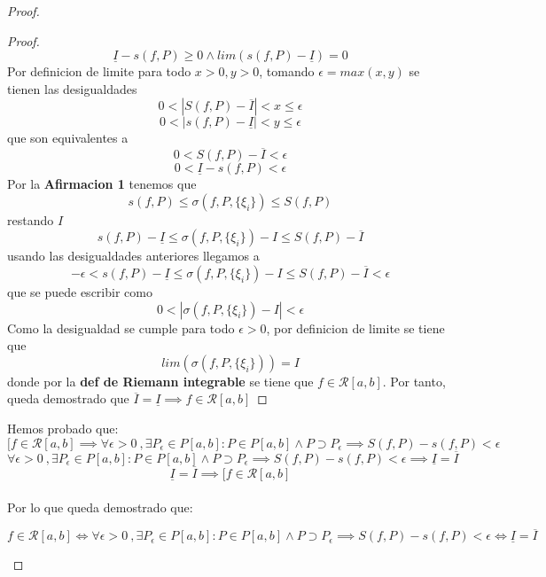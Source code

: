 \documentclass{article}
\begin{document}
\begin{proof}
\begin{enumerate}
\begin{proof}
\[
\underline{I} - s(f, P) \geq 0 \wedge lim (s(f, P) - \underline{I}) = 0
\]
Por definicion de limite para todo \(x > 0, y > 0\), tomando \(\epsilon = max(x, y)\) se tienen las desigualdades 
\[
0< |S(f, P) - \overline{I} | < x \leq \epsilon
\]
\[
0< |s(f, P) - \underline{I} | < y \leq \epsilon 
\]
que son equivalentes a
\[
0< S(f, P) - \overline{I}  < \epsilon
\]
\[
0<  \underline{I} -  s(f, P)  < \epsilon
\]
Por la \textbf{Afirmacion 1} tenemos que 
\[
s(f, P) \leq \sigma(f, P,\{\xi_i\}) \leq S(f, P)
\]
restando \(I\)
\[
s(f, P) -\underline{I} \leq \sigma(f, P,\{\xi_i\}) - I \leq S(f, P) - \overline{I}
\]
usando las desigualdades anteriores llegamos a 
\[
-\epsilon < s(f, P) -\underline{I} \leq \sigma(f, P,\{\xi_i\}) - I \leq S(f, P) - \overline{I} < \epsilon
\]
que se puede escribir como
\[
0 <|\sigma(f, P,\{\xi_i\}) - I |< \epsilon
\]
Como la desigualdad se cumple para todo \(\epsilon > 0\), por definicion de limite se tiene que 
\[
lim(\sigma(f, P,\{\xi_i\})) = I
\]
donde por la \textbf{def de Riemann integrable} se tiene que \(f \in \mathcal{R}[a, b]\). Por tanto, queda demostrado que \( \overline{I} = \underline{I} \implies f \in \mathcal{R}[a, b] \)
\end{proof}
Hemos probado que:
\[[f \in \mathcal{R}[a, b] \implies \forall \epsilon>0\ ,  \exists P_\epsilon \in P[a, b]: P \in P[a, b] \wedge P \supset P_\epsilon \implies S(f, P) - s(f, P) < \epsilon\]
\[\forall \epsilon>0\ ,  \exists P_\epsilon \in P[a, b]: P \in P[a, b] \wedge P \supset P_\epsilon \implies S(f, P) - s(f, P) < \epsilon \implies \underline{I} = \overline{I}\]
\[\underline{I} = \overline{I} \implies [f \in \mathcal{R}[a, b]\]\\
Por lo que queda demostrado que:

\[f \in \mathcal{R}[a, b] \Longleftrightarrow \forall \epsilon>0\ ,  \exists P_\epsilon \in P[a, b]: P \in P[a, b] \wedge P \supset P_\epsilon \implies S(f, P) - s(f, P) < \epsilon \Longleftrightarrow \underline{I} = \overline{I}\]






\end{enumerate}

\end{proof}
\end{document}
